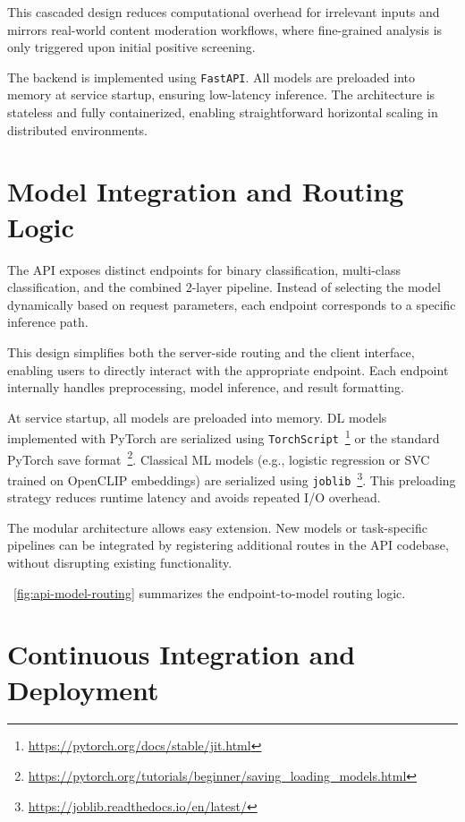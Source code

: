 This cascaded design reduces computational overhead for irrelevant inputs and mirrors real-world content moderation
workflows, where fine-grained analysis is only triggered upon initial positive screening.

The backend is implemented using \texttt{FastAPI}. All models are preloaded into memory at service startup, ensuring
low-latency inference. The architecture is stateless and fully containerized, enabling straightforward horizontal
scaling in distributed environments.

\section{Model Integration and Routing Logic}

The \ac{API} exposes distinct endpoints for binary classification, multi-class classification, and the combined
2-layer pipeline. Instead of selecting the model dynamically based on request parameters, each endpoint corresponds
to a specific inference path.

This design simplifies both the server-side routing and the client interface, enabling users to directly interact
with the appropriate endpoint. Each endpoint internally handles preprocessing, model inference, and result formatting.

At service startup, all models are preloaded into memory. \ac{DL} models implemented with PyTorch are
serialized using \texttt{TorchScript}~\footnote{\url{https://pytorch.org/docs/stable/jit.html}} or the standard
PyTorch save format~\footnote{\url{https://pytorch.org/tutorials/beginner/saving_loading_models.html}}.
Classical \ac{ML} models (e.g., logistic regression or \ac{SVC} trained on OpenCLIP embeddings) are serialized using
\texttt{joblib}~\footnote{\url{https://joblib.readthedocs.io/en/latest/}}. This preloading strategy reduces runtime
latency and avoids repeated I/O overhead.

The modular architecture allows easy extension. New models or task-specific pipelines can be integrated by
registering additional routes in the \ac{API} codebase, without disrupting existing functionality.

~\autoref{fig:api-model-routing} summarizes the endpoint-to-model routing logic.



\section{Continuous Integration and Deployment}

